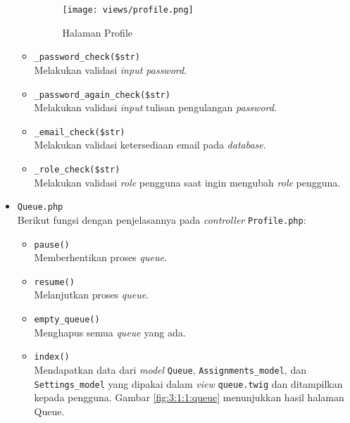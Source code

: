 \begin{itemize}
\begin{itemize}
		            \begin{figure}[H]
			            \centering
			            \texttt{[image: views/profile.png]}
			            \caption{Halaman Profile}
			            \label{fig:3:1:1:profile}
		            \end{figure}
		      \item \verb|_password_check($str)| \\
		            Melakukan validasi \textit{input password}.
		      \item \verb|_password_again_check($str)| \\
		            Melakukan validasi \textit{input} tulisan pengulangan \textit{password}.
		      \item \verb|_email_check($str)| \\
		            Melakukan validasi ketersediaan email pada \textit{database}.
		      \item \verb|_role_check($str)| \\
		            Melakukan validasi \textit{role} pengguna saat ingin mengubah \textit{role} pengguna.

	      \end{itemize}

	\item \verb|Queue.php| \\
	      Berikut fungsi dengan penjelasannya pada \textit{controller} \verb|Profile.php|:

	      \begin{itemize}
		      \item \verb|pause()| \\
		            Memberhentikan proses \textit{queue}.
		      \item \verb|resume()| \\
		            Melanjutkan proses \textit{queue}.
		      \item \verb|empty_queue()| \\
		            Menghapus semua \textit{queue} yang ada.
		      \item \verb|index()| \\
		            Mendapatkan data dari \textit{model} \verb|Queue|, \verb|Assignments_model|, dan \verb|Settings_model| yang dipakai dalam \textit{view} \verb|queue.twig| dan ditampilkan kepada pengguna. Gambar \ref{fig:3:1:1:queue} menunjukkan hasil halaman Queue.

		            \vspace{0.9cm}


\end{itemize}
\end{itemize}
